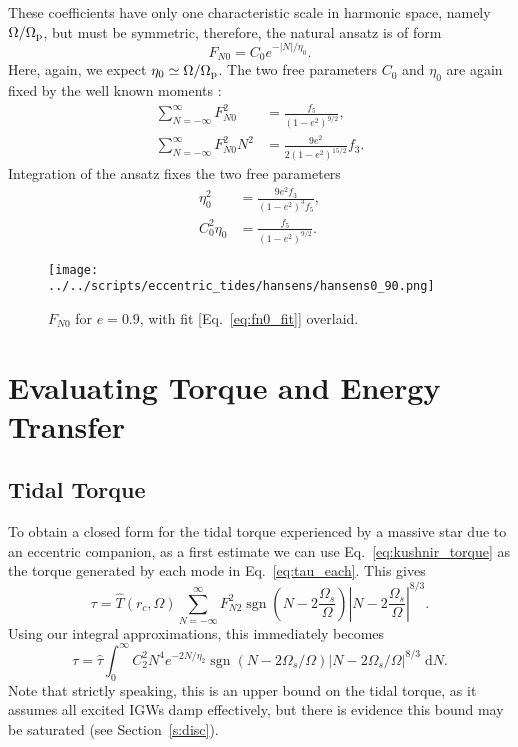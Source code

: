\documentclass[
        fleqn,
        usenatbib,
        referee,
    ]{mnras}
\newcommand*{\abs}[1]{\left|#1\right|}
\newcommand*{\p}[1]{\left(#1\right)}
\DeclareMathOperator*{\sgn}{sgn}
\begin{document}
These coefficients have only one characteristic scale in harmonic space, namely
$\Omega / \Omega_{\rm p}$, but must be symmetric, therefore, the natural
ansatz is of form
\begin{equation}
    F_{N0} = C_0 e^{-\abs{N} / \eta_0}.\label{eq:fn0_fit}
\end{equation}
Here, again, we expect $\eta_0 \simeq \Omega / \Omega_{\rm p}$. The two free
parameters $C_0$ and $\eta_0$ are again fixed by the well known moments
\citep{hut81,sl,vlf}:
\begin{align}
    \sum\limits_{N = -\infty}^\infty F_{N0}^2 &= \frac{f_5}{\p{1 - e^2}^{9/2}}
        ,\\
    \sum\limits_{N = -\infty}^\infty F_{N0}^2 N^2
        &= \frac{9e^2}{2\p{1 - e^2}^{15/2}}
            f_3.
\end{align}
Integration of the ansatz fixes the two free parameters
\begin{align}
    \eta_0^2 &= \frac{9e^2f_3}{\p{1 - e^2}^{3}f_5},\\
    C_0^2\eta_0 &= \frac{f_5}{\p{1 - e^2}^{9/2}}.
\end{align}

\begin{figure}
    \centering
    \texttt{[image: ../../scripts/eccentric\_tides/hansens/hansens0\_90.png]}
    \caption{$F_{N0}$ for $e = 0.9$, with fit [Eq.~\eqref{eq:fn0_fit}]
    overlaid.}\label{fig:fn0_fit}
\end{figure}

\section{Evaluating Torque and Energy Transfer}\label{s:eval}

\subsection{Tidal Torque}

To obtain a closed form for the tidal torque experienced by a massive star due
to an eccentric companion, as a first estimate we can use
Eq.~\eqref{eq:kushnir_torque} as the torque generated by each mode in
Eq.~\eqref{eq:tau_each}. This gives
\begin{equation}
    \tau = \hat{T}(r_c, \Omega) \sum\limits_{N = -\infty}^\infty
        F_{N2}^2 \sgn\p{N - 2\frac{\Omega_s}{\Omega}}
            \abs{N - 2\frac{\Omega_s}{\Omega}}^{8/3}.\label{eq:tau_sum}
\end{equation}
Using our integral approximations, this immediately becomes
\begin{equation}
    \tau = \hat{\tau} \int_0^\infty C_2^2 N^4 e^{-2N / \eta_2}
        \sgn\left(N - 2\Omega_s / \Omega\right) \left|N - 2 \Omega_s /
            \Omega\right|^{8/3}\;\mathrm{d}N.\label{eq:tau_int}
\end{equation}
Note that strictly speaking, this is an upper bound on the tidal torque, as it
assumes all excited IGWs damp effectively, but there is evidence this bound may
be saturated (see Section~\ref{s:disc}).
\end{document}
